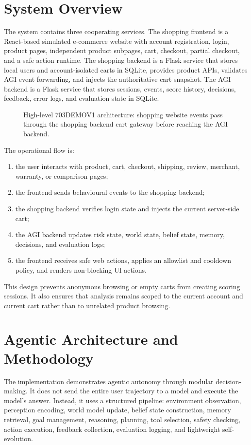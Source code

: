 \documentclass{article}
\begin{document}
\section{System Overview}
The system contains three cooperating services. The shopping frontend is a React-based simulated e-commerce website with account registration, login, product pages, independent product subpages, cart, checkout, partial checkout, and a safe action runtime. The shopping backend is a Flask service that stores local users and account-isolated carts in SQLite, provides product APIs, validates AGI event forwarding, and injects the authoritative cart snapshot. The AGI backend is a Flask service that stores sessions, events, score history, decisions, feedback, error logs, and evaluation state in SQLite.

\begin{figure}[htbp]
  \centering
  \caption{High-level 703DEMOV1 architecture: shopping website events pass through the shopping backend cart gateway before reaching the AGI backend.}
  \label{fig:architecture}
\end{figure}

The operational flow is:
\begin{enumerate}[leftmargin=*]
  \item the user interacts with product, cart, checkout, shipping, review, merchant, warranty, or comparison pages;
  \item the frontend sends behavioural events to the shopping backend;
  \item the shopping backend verifies login state and injects the current server-side cart;
  \item the AGI backend updates risk state, world state, belief state, memory, decisions, and evaluation logs;
  \item the frontend receives safe web actions, applies an allowlist and cooldown policy, and renders non-blocking UI actions.
\end{enumerate}

This design prevents anonymous browsing or empty carts from creating scoring sessions. It also ensures that analysis remains scoped to the current account and current cart rather than to unrelated product browsing.

\section{Agentic Architecture and Methodology}
The implementation demonstrates agentic autonomy through modular decision-making. It does not send the entire user trajectory to a model and execute the model's answer. Instead, it uses a structured pipeline: environment observation, perception encoding, world model update, belief state construction, memory retrieval, goal management, reasoning, planning, tool selection, safety checking, action execution, feedback collection, evaluation logging, and lightweight self-evolution.
\end{document}
